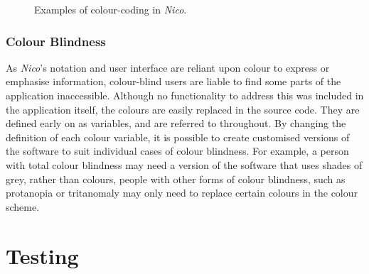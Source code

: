 \documentclass[12pt,twoside,notitlepage,xetex]{report}
\begin{document}
\begin{center}
\begin{figure}[H]
\begin{center}
{}\hspace{2cm}
\end{center}
\caption{Examples of colour-coding in \emph{Nico}.}
\label{fig:ColourCoding}
\end{figure}
\end{center}

\subsubsection{Colour Blindness}

As \emph{Nico}'s notation and user interface are reliant upon colour to express or emphasise information, colour-blind users are liable to find some parts of the application inaccessible.  Although no functionality to address this was included in the application itself, the colours are easily replaced in the source code.  They are defined early on as variables, and are referred to throughout.  By changing the definition of each colour variable, it is possible to create customised versions of the software to suit individual cases of colour blindness.  For example, a person with total colour blindness may need a version of the software that uses shades of grey, rather than colours, people with other forms of colour blindness, such as protanopia or tritanomaly may only need to replace certain colours in the colour scheme.%

\section{Testing}
\end{document}
